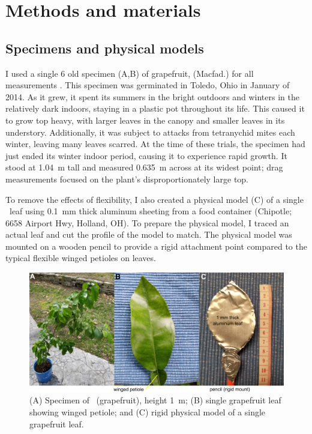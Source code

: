\section{Methods and materials}
\label{sec:methods}

\subsection{Specimens and physical models}
I used a single \SI{6}{\year} old specimen (A,B) of grapefruit, \Citrusxparadisi (Macfad.) for all measurements \citep{macfayden1837flora}. This specimen was germinated in Toledo, Ohio in January of 2014. As it grew, it spent its summers in the bright outdoors and winters in the relatively dark indoors, staying in a plastic pot throughout its life. This caused it to grow top heavy, with larger leaves in the canopy and smaller leaves in its understory. Additionally, it was subject to attacks from tetranychid mites each winter, leaving many leaves scarred. At the time of these trials, the specimen had just ended its winter indoor period, causing it to experience rapid growth. It stood at \SI{1.04}{\meter} tall and measured \SI{0.635}{\meter} across at its widest point; drag measurements focused on the plant's disproportionately large top.

To remove the effects of flexibility, I also created a physical model (C) of a single \Cxparadisi\ leaf using \SI{0.1}{\milli\meter} thick aluminum sheeting from a food container (Chipotle; 6658 Airport Hwy, Holland, OH). To prepare the physical model, I traced an actual leaf and cut the profile of the model to match. The physical model was mounted on a wooden pencil to provide a rigid attachment point compared to the typical flexible winged petioles on \Cxparadisi leaves. 
\begin{figure}
\begin{center}
\includegraphics[width=6in]{figures/fig1.png}
\end{center}
\caption{(A) Specimen of \Citrusxparadisi\ (grapefruit), height \SI{1}{\meter}; (B) single grapefruit leaf showing winged petiole; and (C) rigid physical model of a single grapefruit leaf.}
\label{fig:methods:specimens}
\end{figure}








